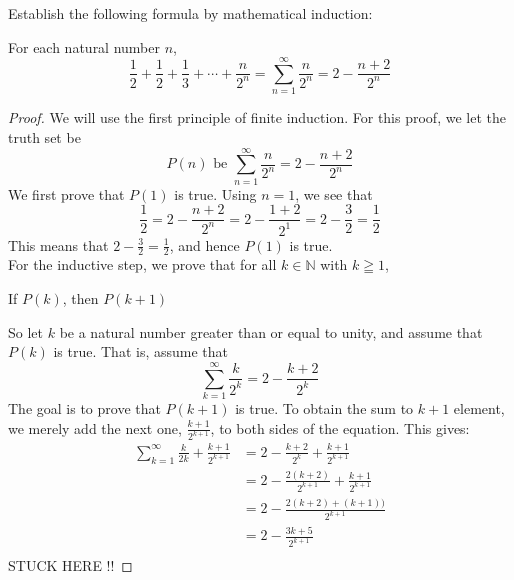 \newpage
\begin{example}
Establish the following formula by mathematical induction: 
    
    \begin{tcolorbox}
        \begin{theorem}
            For each natural number $n$,
                \begin{equation*}
                    \frac{1}{2} + \frac{1}{2} + \frac{1}{3}  + \cdots + \frac{n}{2^n} = \sum_{n=1}^{\infty}{\frac{n}{2^n}} = 2 - \frac{n+2}{2^n}
                \end{equation*}
        \end{theorem}
    \end{tcolorbox}

    \begin{proof}
        We will use the first principle of finite induction. For this proof, we let the truth set be
            \begin{equation*}
                P(n) \text{ be } \sum_{n=1}^{\infty}{\frac{n}{2^n}} = 2 - \frac{n+2}{2^n}
            \end{equation*}
        We first prove that $P(1)$ is true. Using $n=1$, we see that
            \begin{equation*}
                \frac{1}{2} = 2 - \frac{n+2}{2^n} = 2 - \frac{1+2}{2^1} = 2 - \frac{3}{2} = \frac{1}{2}
            \end{equation*}
        This means that $2 - \frac{3}{2} = \frac{1}{2}$, and hence $P(1)$ is true. \\
        For the inductive step, we prove that for all $k \in \mathbb{N}$ with $k \geqq 1$, 
            \begin{center}
                If $P(k)$, then $P(k+1)$
            \end{center}
        So let $k$ be a natural number greater than or equal to unity, and assume that $P(k)$ is true. That is, assume that 
            \begin{equation*}
               \sum_{k=1}^{\infty}{\frac{k}{2^k}} = 2 - \frac{k+2}{2^k}
            \end{equation*}
        The goal is to prove that $P(k+1)$ is true. To obtain the sum to $k+1$ element, we merely add the next one, $\frac{k+1}{2^{k+1}}$, to both sides of the equation. This gives: 
            \begin{align*}
                \sum_{k=1}^{\infty}{\frac{k}{2k}} + {\frac{k+1}{2^{k+1}}} & = 2 - \frac{k+2}{2^k} + \frac{k+1}{2^{k+1}} \\
                    & = 2 - \frac{2(k+2)}{2^{k+1}} + \frac{k+1}{2^{k+1}} \\
                    & = 2 - \frac{2(k+2) + (k+1))}{2^{k+1}} \\
                    & = 2 - \frac{3k + 5}{2^{k+1}} \\  
            \end{align*}
     STUCK HERE !!
    \end{proof}
\end{example}


